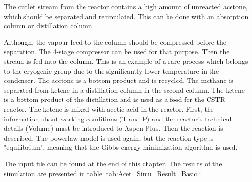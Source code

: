	The outlet stream from the reactor contains a high amount of unreacted acetone, which should be separated and recirculated. This can be done with an absorption column or distillation column. 
	
	Although, the vapour feed to the column should be compressed before the separation. The 4-stage compressor can be used for that purpose. 
	Then the stream is fed into the column. This is an example of a rare process which belongs to the cryogenic group due to the significantly lower temperature in the condenser. The acetone is a bottom product and is recycled. The methane is separated from ketene in a distillation column in the second column. 
	The ketene is a bottom product of the distillation and is used as a feed for the CSTR reactor. The ketene is mixed with acetic acid in the reactor. First, the information about working conditions (T and P) and the reactor's technical details (Volume) must be introduced to Aspen Plus. Then the reaction is described. The powerlaw model is used again, but the reaction type is "equilibrium", meaning that the Gibbs energy minimization algorithm is used. 
	
	The input file can be found at the end of this chapter. The results of the simulation are presented in table \ref{tab:Acet_Simu_Result_Basic}:
	
